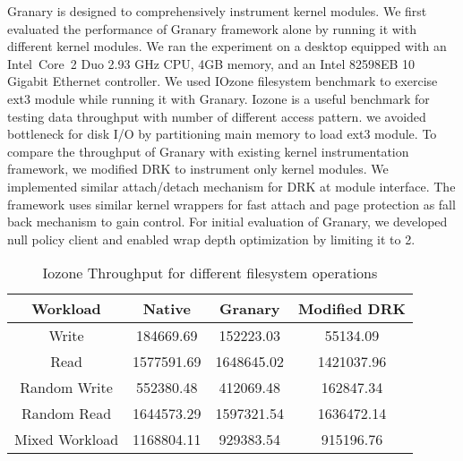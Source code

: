 Granary is designed to comprehensively instrument kernel modules. We first evaluated the performance of Granary framework alone by running it with different kernel modules. We ran the experiment on a desktop equipped with an Intel\textregistered\ Core\texttrademark\ 2 Duo 2.93 GHz CPU, 4GB memory, and an Intel 82598EB 10 Gigabit Ethernet controller. We used IOzone filesystem benchmark to exercise ext3 module while running it with Granary. Iozone is a useful benchmark for testing data throughput with number of different access pattern. we avoided bottleneck for disk I/O by partitioning main memory to load ext3 module. To compare the throughput of Granary with existing kernel instrumentation framework, we modified DRK to instrument only kernel modules. We implemented similar attach/detach mechanism for DRK at module interface. The framework uses similar kernel wrappers for fast attach and page protection as fall back mechanism to gain control. For initial evaluation of Granary, we developed null policy client and enabled wrap depth optimization by limiting it to 2.


\begin{table*}[thp!]
\caption{Iozone Throughput for different filesystem operations}
\centering
\begin{tabular}{c c c c}
\hline\hline
Workload & Native & Granary & Modified DRK  \\ [0.5ex]
\hline
Write & 184669.69 & 152223.03 & 55134.09 \\
Read & 1577591.69 & 1648645.02 & 1421037.96 \\
Random Write  & 552380.48 & 412069.48 & 162847.34 \\
Random Read & 1644573.29 & 1597321.54 & 1636472.14 \\

Mixed Workload & 1168804.11 & 929383.54 & 915196.76 \\[1ex]
\hline
\end{tabular}
\label{table:nonlin}
\end{table*}





